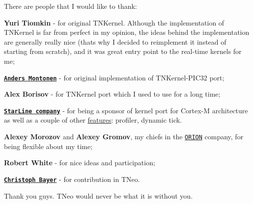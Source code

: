There are people that I would like to thank\+:


\begin{DoxyItemize}
\item {\bfseries Yuri Tiomkin} -\/ for original T\+N\+Kernel. Although the implementation of T\+N\+Kernel is far from perfect in my opinion, the ideas behind the implementation are generally really nice (that\textquotesingle{}s why I decided to reimplement it instead of starting from scratch), and it was great entry point to the real-\/time kernels for me;
\item \href{https://github.com/andersm}{\tt {\bfseries Anders Montonen}} -\/ for original implementation of T\+N\+Kernel-\/\+P\+I\+C32 port;
\item {\bfseries Alex Borisov} -\/ for T\+N\+Kernel port which I used to use for a long time;
\item \href{http://starline.ru}{\tt {\bfseries Star\+Line company}} -\/ for being a sponsor of kernel port for Cortex-\/M architecture as well as a couple of other \hyperlink{features}{features}\+: profiler, dynamic tick.
\item {\bfseries Alexey Morozov} and {\bfseries Alexey Gromov}, my chiefs in the \href{http://orionspb.ru/}{\tt O\+R\+I\+ON} company, for being flexible about my time;
\item {\bfseries Robert White} -\/ for nice ideas and participation;
\item \href{https://bitbucket.org/chrbayer}{\tt {\bfseries Christoph Bayer}} -\/ for contribution in T\+Neo.
\end{DoxyItemize}

Thank you guys. T\+Neo would never be what it is without you. 